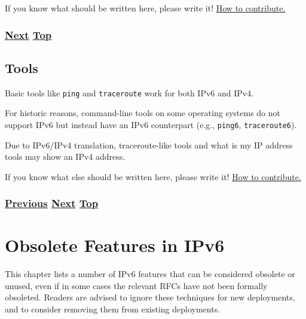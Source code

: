 \documentclass[
]{article}
\begin{document}
If you know what should be written here, please write it!
\href{https://github.com/becarpenter/book6/blob/main/1.\%20Introduction\%20and\%20Foreword/How\%20to\%20contribute.md\#how-to-contribute}{How
to contribute.}

\subsubsection{\texorpdfstring{\hyperref[tools]{Next}
\hyperref[troubleshooting]{Top}}{Next Top}}\label{next-top-8}

\pagebreak

\subsection{Tools}\label{tools}

Basic tools like \texttt{ping} and \texttt{traceroute} work for both
IPv6 and IPv4.

For historic reasons, command-line tools on some operating systems do
not support IPv6 but instead have an IPv6 counterpart (e.g.,
\texttt{ping6}, \texttt{traceroute6}).

Due to IPv6/IPv4 translation, traceroute-like tools and
\textquotesingle what is my IP address\textquotesingle{} tools may show
an IPv4 address.

If you know what else should be written here, please write it!
\href{https://github.com/becarpenter/book6/blob/main/1.\%20Introduction\%20and\%20Foreword/How\%20to\%20contribute.md\#how-to-contribute}{How
to contribute.}

\subsubsection{\texorpdfstring{\hyperref[advanced-troubleshooting]{Previous}
\hyperref[obsolete-features-in-ipv6]{Next}
\hyperref[troubleshooting]{Top}}{Previous Next Top}}\label{previous-next-top-38}

\pagebreak

\section{Obsolete Features in IPv6}\label{obsolete-features-in-ipv6}

This chapter lists a number of IPv6 features that can be considered
obsolete or unused, even if in some cases the relevant RFCs have not
been formally obsoleted. Readers are advised to ignore these techniques
for new deployments, and to consider removing them from existing
deployments.
\end{document}
